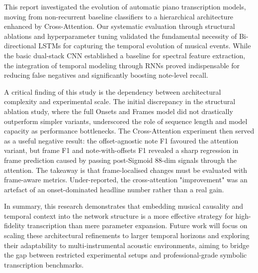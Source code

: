\documentclass{article}
\begin{document}
This report investigated the evolution of automatic piano transcription models, moving from non-recurrent baseline classifiers to a hierarchical architecture enhanced by Cross-Attention. Our systematic evaluation through structural ablations and hyperparameter tuning validated the fundamental necessity of Bi-directional LSTMs for capturing the temporal evolution of musical events. While the basic dual-stack CNN established a baseline for spectral feature extraction, the integration of temporal modeling through RNNs proved indispensable for reducing false negatives and significantly boosting note-level recall.

A critical finding of this study is the dependency between architectural complexity and experimental scale. The initial discrepancy in the structural ablation study, where the full Onsets and Frames model did not drastically outperform simpler variants, underscored the role of sequence length and model capacity as performance bottlenecks. The Cross-Attention experiment then served as a useful negative result: the offset-agnostic note F1 favoured the attention variant, but frame F1 and note-with-offsets F1 revealed a sharp regression in frame prediction caused by passing post-Sigmoid 88-dim signals through the attention. The takeaway is that frame-localised changes must be evaluated with frame-aware metrics. Under-reported, the cross-attention "improvement" was an artefact of an onset-dominated headline number rather than a real gain.

In summary, this research demonstrates that embedding musical causality and temporal context into the network structure is a more effective strategy for high-fidelity transcription than mere parameter expansion. Future work will focus on scaling these architectural refinements to larger temporal horizons and exploring their adaptability to multi-instrumental acoustic environments, aiming to bridge the gap between restricted experimental setups and professional-grade symbolic transcription benchmarks.




\end{document}
